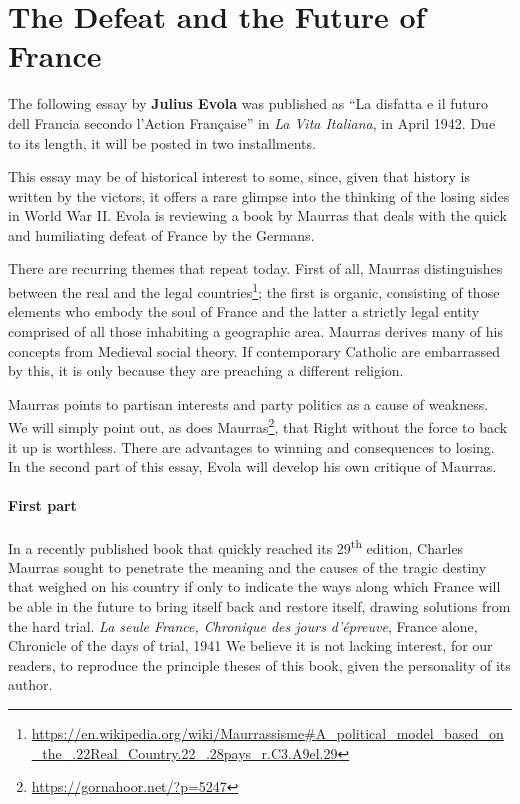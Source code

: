 \section{The Defeat and the Future of France}

The following essay by \textbf{Julius Evola} was published as ``La disfatta e il futuro dell Francia secondo l'Action Française'' in \textit{La Vita Italiana}, in April 1942. Due to its length, it will be posted in two installments.

\begin{quotationx}
This essay may be of historical interest to some, since, given that history is written by the victors, it offers a rare glimpse into the thinking of the losing sides in World War II. Evola is reviewing a book by Maurras that deals with the quick and humiliating defeat of France by the Germans.

There are recurring themes that repeat today. First of all, Maurras distinguishes between the real and the legal countries\footnote{\url{https://en.wikipedia.org/wiki/Maurrassisme\#A\_political\_model\_based\_on\_the\_.22Real\_Country.22\_.28pays\_r.C3.A9el.29}}; the first is organic, consisting of those elements who embody the soul of France and the latter a strictly legal entity comprised of all those inhabiting a geographic area. Maurras derives many of his concepts from Medieval social theory. If contemporary Catholic are embarrassed by this, it is only because they are preaching a different religion.

Maurras points to partisan interests and party politics as a cause of weakness. We will simply point out, as does Maurras\footnote{\url{https://gornahoor.net/?p=5247}}, that Right without the force to back it up is worthless. There are advantages to winning and consequences to losing. In the second part of this essay, Evola will develop his own critique of Maurras.
\end{quotationx}

\paragraph{First part}
In a recently published book that quickly reached its 29\textsuperscript{th} edition, Charles Maurras sought to penetrate the meaning and the causes of the tragic destiny that weighed on his country if only to indicate the ways along which France will be able in the future to bring itself back and restore itself, drawing solutions from the hard trial. \emph{La seule France, Chronique des jours d'épreuve}, France alone, Chronicle of the days of trial, 1941 We believe it is not lacking interest, for our readers, to reproduce the principle theses of this book, given the personality of its author.


